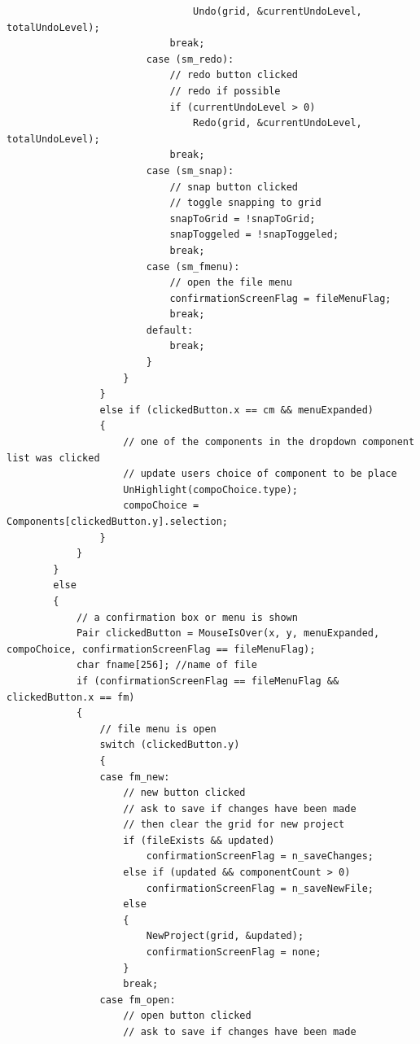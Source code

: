 \documentclass[report]{subfiles}
\begin{document}
\begin{lstlisting}
                                Undo(grid, &currentUndoLevel, totalUndoLevel);
                            break;
                        case (sm_redo):
                            // redo button clicked
                            // redo if possible
                            if (currentUndoLevel > 0)
                                Redo(grid, &currentUndoLevel, totalUndoLevel);
                            break;
                        case (sm_snap):
                            // snap button clicked
                            // toggle snapping to grid
                            snapToGrid = !snapToGrid;
                            snapToggeled = !snapToggeled;
                            break;
                        case (sm_fmenu):
                            // open the file menu
                            confirmationScreenFlag = fileMenuFlag;
                            break;
                        default:
                            break;
                        }
                    }
                }
                else if (clickedButton.x == cm && menuExpanded)
                {
                    // one of the components in the dropdown component list was clicked
                    // update users choice of component to be place
                    UnHighlight(compoChoice.type);
                    compoChoice = Components[clickedButton.y].selection;
                }
            }
        }
        else
        {
            // a confirmation box or menu is shown
            Pair clickedButton = MouseIsOver(x, y, menuExpanded, compoChoice, confirmationScreenFlag == fileMenuFlag);
            char fname[256]; //name of file
            if (confirmationScreenFlag == fileMenuFlag && clickedButton.x == fm)
            {
                // file menu is open
                switch (clickedButton.y)
                {
                case fm_new:
                    // new button clicked
                    // ask to save if changes have been made
                    // then clear the grid for new project
                    if (fileExists && updated)
                        confirmationScreenFlag = n_saveChanges;
                    else if (updated && componentCount > 0)
                        confirmationScreenFlag = n_saveNewFile;
                    else
                    {
                        NewProject(grid, &updated);
                        confirmationScreenFlag = none;
                    }
                    break;
                case fm_open:
                    // open button clicked
                    // ask to save if changes have been made

\end{lstlisting}
\end{document}
